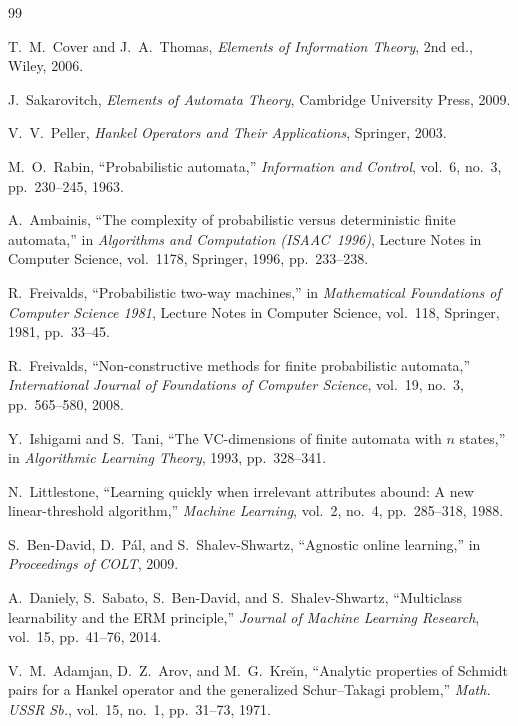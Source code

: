 \documentclass[12pt]{article}
\theoremstyle{definition}
\begin{document}
\begin{thebibliography}{99}

T.~M.~Cover and J.~A.~Thomas,
\emph{Elements of Information Theory}, 2nd ed.,
Wiley, 2006.

J.~Sakarovitch,
\emph{Elements of Automata Theory},
Cambridge University Press, 2009.

V.~V.~Peller,
\emph{Hankel Operators and Their Applications},
Springer, 2003.

M.~O.~Rabin,
``Probabilistic automata,''
\emph{Information and Control}, vol.~6, no.~3, pp.~230--245, 1963.

A.~Ambainis,
``The complexity of probabilistic versus deterministic finite automata,''
in \emph{Algorithms and Computation (ISAAC~1996)},
Lecture Notes in Computer Science, vol.~1178,
Springer, 1996, pp.~233--238.

R.~Freivalds,
``Probabilistic two-way machines,''
in \emph{Mathematical Foundations of Computer Science 1981},
Lecture Notes in Computer Science, vol.~118,
Springer, 1981, pp.~33--45.

R.~Freivalds,
``Non-constructive methods for finite probabilistic automata,''
\emph{International Journal of Foundations of Computer Science},
vol.~19, no.~3, pp.~565--580, 2008.

Y.~Ishigami and S.~Tani,
``The VC-dimensions of finite automata with $n$ states,''
in \emph{Algorithmic Learning Theory},
1993, pp.~328--341.

N.~Littlestone,
``Learning quickly when irrelevant attributes abound: A new linear-threshold
algorithm,''
\emph{Machine Learning}, vol.~2, no.~4, pp.~285--318, 1988.

S.~Ben-David, D.~P\'al, and S.~Shalev-Shwartz,
``Agnostic online learning,''
in \emph{Proceedings of COLT}, 2009.

A.~Daniely, S.~Sabato, S.~Ben-David, and S.~Shalev-Shwartz,
``Multiclass learnability and the ERM principle,''
\emph{Journal of Machine Learning Research},
vol.~15, pp.~41--76, 2014.

V.~M.~Adamjan, D.~Z.~Arov, and M.~G.~Kre\u{\i}n,
``Analytic properties of Schmidt pairs for a Hankel operator and the
generalized Schur--Takagi problem,''
\emph{Math. USSR Sb.}, vol.~15, no.~1, pp.~31--73, 1971.


\end{thebibliography}
\end{document}
